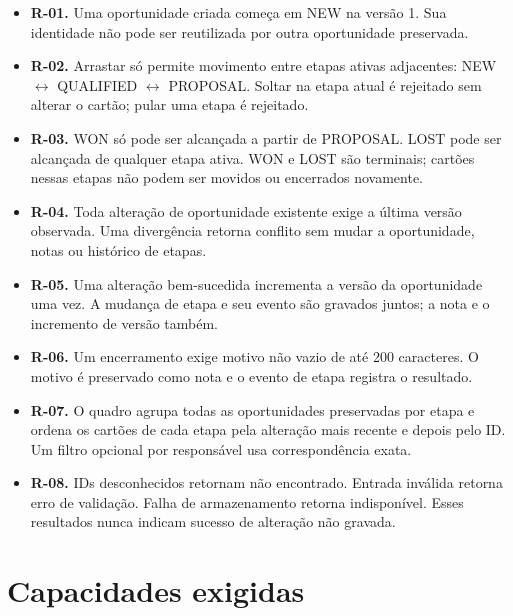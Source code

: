 \documentclass[10pt,a4paper]{article}
\begin{document}
\begin{itemize}

\item \textbf{R-01.} Uma oportunidade criada começa em NEW na versão 1. Sua identidade não pode ser reutilizada por outra oportunidade preservada.

\item \textbf{R-02.} Arrastar só permite movimento entre etapas ativas adjacentes: NEW \(\leftrightarrow\) QUALIFIED \(\leftrightarrow\) PROPOSAL. Soltar na etapa atual é rejeitado sem alterar o cartão; pular uma etapa é rejeitado.

\item \textbf{R-03.} WON só pode ser alcançada a partir de PROPOSAL. LOST pode ser alcançada de qualquer etapa ativa. WON e LOST são terminais; cartões nessas etapas não podem ser movidos ou encerrados novamente.

\item \textbf{R-04.} Toda alteração de oportunidade existente exige a última versão observada. Uma divergência retorna conflito sem mudar a oportunidade, notas ou histórico de etapas.

\item \textbf{R-05.} Uma alteração bem-sucedida incrementa a versão da oportunidade uma vez. A mudança de etapa e seu evento são gravados juntos; a nota e o incremento de versão também.

\item \textbf{R-06.} Um encerramento exige motivo não vazio de até 200 caracteres. O motivo é preservado como nota e o evento de etapa registra o resultado.

\item \textbf{R-07.} O quadro agrupa todas as oportunidades preservadas por etapa e ordena os cartões de cada etapa pela alteração mais recente e depois pelo ID. Um filtro opcional por responsável usa correspondência exata.

\item \textbf{R-08.} IDs desconhecidos retornam não encontrado. Entrada inválida retorna erro de validação. Falha de armazenamento retorna indisponível. Esses resultados nunca indicam sucesso de alteração não gravada.

\end{itemize}

\section{Capacidades exigidas}
\end{document}
